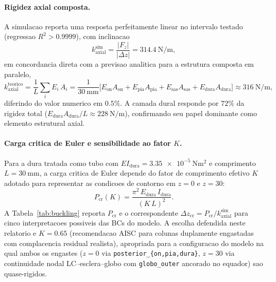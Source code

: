 \paragraph{Rigidez axial composta.} A simulacao reporta uma resposta perfeitamente linear no intervalo testado (regressao $R^2 > 0.9999$), com inclinacao
\begin{equation}
  k_{\mathrm{axial}}^{\mathrm{sim}} = \frac{|F_z|}{|\Delta z|} = \SI{314.4}{\newton\per\meter},
  \label{eq:k-axial-sim}
\end{equation}
em concordancia direta com a previsao analitica para a estrutura composta em paralelo,
\begin{equation}
  k_{\mathrm{axial}}^{\mathrm{teorico}} = \frac{1}{L}\sum_i E_i\, A_i = \frac{1}{\SI{30}{\milli\meter}}\bigl[ E_{\mathrm{on}}A_{\mathrm{on}} + E_{\mathrm{pia}}A_{\mathrm{pia}} + E_{\mathrm{sas}}A_{\mathrm{sas}} + E_{\mathrm{dura}}A_{\mathrm{dura}} \bigr] \approx \SI{316}{\newton\per\meter},
  \label{eq:k-axial-teorico}
\end{equation}
diferindo do valor numerico em $0.5\%$. A camada dural responde por $72\%$ da rigidez total ($E_{\mathrm{dura}} A_{\mathrm{dura}} / L \approx \SI{228}{\newton\per\meter}$), confirmando seu papel dominante como elemento estrutural axial.

\paragraph{Carga critica de Euler e sensibilidade ao fator $K$.} Para a dura tratada como tubo com $EI_{\mathrm{dura}} = \SI{3.35e-5}{\newton\meter\squared}$ e comprimento $L = \SI{30}{\milli\meter}$, a carga critica de Euler depende do fator de comprimento efetivo $K$ adotado para representar as condicoes de contorno em $z = 0$ e $z = 30$:
\begin{equation}
  P_{\mathrm{cr}}(K) = \frac{\pi^2\, E_{\mathrm{dura}}\, I_{\mathrm{dura}}}{(K\, L)^2}.
  \label{eq:euler-Pcr}
\end{equation}
A Tabela~\ref{tab:buckling} reporta $P_{\mathrm{cr}}$ e o correspondente $\Delta z_{\mathrm{cr}} = P_{\mathrm{cr}} / k_{\mathrm{axial}}^{\mathrm{sim}}$ para cinco interpretacoes possiveis das BCs do modelo. A escolha defendida neste relatorio e $K = 0.65$ (recomendacao AISC para colunas duplamente engastadas com complacencia residual realista), apropriada para a configuracao do modelo na qual ambos os engastes ($z = 0$ via \texttt{posterior\_\{on,pia,dura\}}, $z = 30$ via continuidade nodal LC--esclera--globo com \texttt{globo\_outer} ancorado no equador) sao quase-rigidos.

